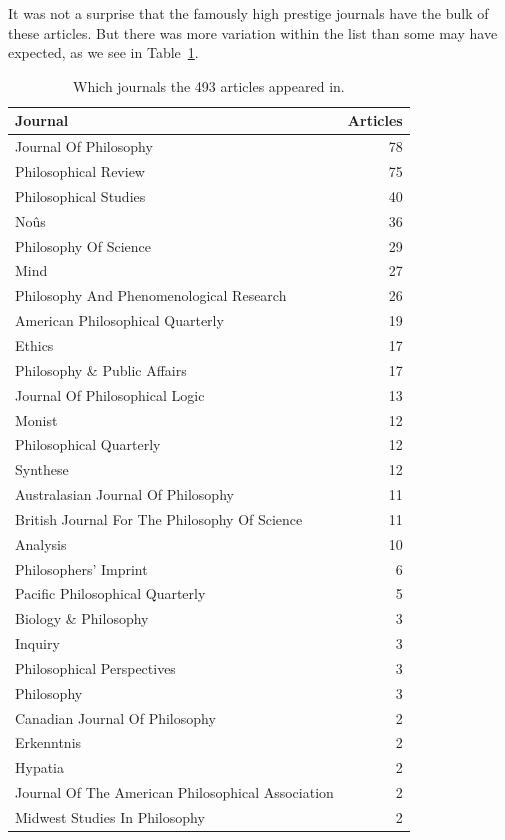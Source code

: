 \documentclass[
  10pt,
  letterpaper,
  DIV=11,
  numbers=noendperiod,
  twoside]{scrartcl}
\begin{document}
It was not a surprise that the famously high prestige journals have the
bulk of these articles. But there was more variation within the list
than some may have expected, as we see in
Table~\ref{tbl-journals-in-main-bib}.

\begin{longtable}[]{@{}lr@{}}

\caption{\label{tbl-journals-in-main-bib}Which journals the 493 articles
appeared in.}

\tabularnewline

\toprule\noalign{}
Journal & Articles \\
\midrule\noalign{}
\endhead
\bottomrule\noalign{}
\endlastfoot
Journal Of Philosophy & 78 \\
Philosophical Review & 75 \\
Philosophical Studies & 40 \\
Noûs & 36 \\
Philosophy Of Science & 29 \\
Mind & 27 \\
Philosophy And Phenomenological Research & 26 \\
American Philosophical Quarterly & 19 \\
Ethics & 17 \\
Philosophy \& Public Affairs & 17 \\
Journal Of Philosophical Logic & 13 \\
Monist & 12 \\
Philosophical Quarterly & 12 \\
Synthese & 12 \\
Australasian Journal Of Philosophy & 11 \\
British Journal For The Philosophy Of Science & 11 \\
Analysis & 10 \\
Philosophers' Imprint & 6 \\
Pacific Philosophical Quarterly & 5 \\
Biology \& Philosophy & 3 \\
Inquiry & 3 \\
Philosophical Perspectives & 3 \\
Philosophy & 3 \\
Canadian Journal Of Philosophy & 2 \\
Erkenntnis & 2 \\
Hypatia & 2 \\
Journal Of The American Philosophical Association & 2 \\
Midwest Studies In Philosophy & 2 \\

\end{longtable}
\end{document}
